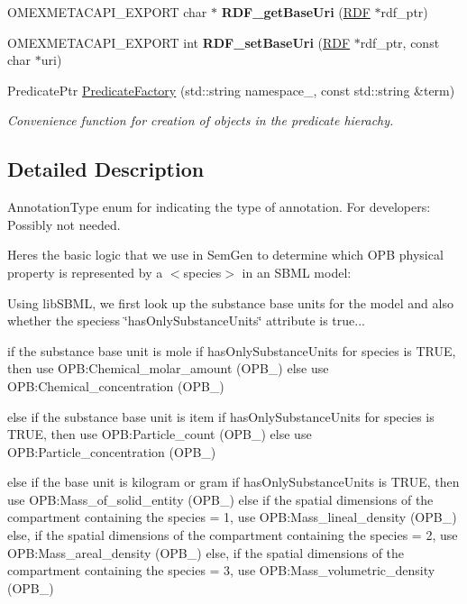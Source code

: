 \begin{DoxyCompactItemize}
O\+M\+E\+X\+M\+E\+T\+A\+C\+A\+P\+I\+\_\+\+E\+X\+P\+O\+RT char $\ast$ {\bfseries R\+D\+F\+\_\+get\+Base\+Uri} (\hyperlink{classomexmeta_1_1RDF}{R\+DF} $\ast$rdf\+\_\+ptr)
\item 
\mbox{\label{namespaceomexmeta_a64ae848c4570f1efb4d47e795b76adcd}} 
O\+M\+E\+X\+M\+E\+T\+A\+C\+A\+P\+I\+\_\+\+E\+X\+P\+O\+RT int {\bfseries R\+D\+F\+\_\+set\+Base\+Uri} (\hyperlink{classomexmeta_1_1RDF}{R\+DF} $\ast$rdf\+\_\+ptr, const char $\ast$uri)
\item 
Predicate\+Ptr \hyperlink{namespaceomexmeta_a0a8d50daa10e421d0722520cdef0ab9a}{Predicate\+Factory} (std\+::string namespace\+\_\+, const std\+::string \&term)
\begin{DoxyCompactList}\small\item\em Convenience function for creation of objects in the predicate hierachy. \end{DoxyCompactList}\end{DoxyCompactItemize}


\subsection{Detailed Description}
Annotation\+Type enum for indicating the type of annotation. For developers\+: Possibly not needed.

Here\textquotesingle{}s the basic logic that we use in Sem\+Gen to determine which O\+PB physical property is represented by a $<$species$>$ in an S\+B\+ML model\+:

Using lib\+S\+B\+ML, we first look up the substance base units for the model and also whether the species\textquotesingle{}s \char`\"{}has\+Only\+Substance\+Units\char`\"{} attribute is true...

if the substance base unit is mole if has\+Only\+Substance\+Units for species is T\+R\+UE, then use O\+PB\+:Chemical\+\_\+molar\+\_\+amount (O\+P\+B\+\_) else use O\+PB\+:Chemical\+\_\+concentration (O\+P\+B\+\_)

else if the substance base unit is item if has\+Only\+Substance\+Units for species is T\+R\+UE, then use O\+PB\+:Particle\+\_\+count (O\+P\+B\+\_) else use O\+PB\+:Particle\+\_\+concentration (O\+P\+B\+\_)

else if the base unit is kilogram or gram if has\+Only\+Substance\+Units is T\+R\+UE, then use O\+PB\+:Mass\+\_\+of\+\_\+solid\+\_\+entity (O\+P\+B\+\_) else if the spatial dimensions of the compartment containing the species = 1, use O\+PB\+:Mass\+\_\+lineal\+\_\+density (O\+P\+B\+\_) else, if the spatial dimensions of the compartment containing the species = 2, use O\+PB\+:Mass\+\_\+areal\+\_\+density (O\+P\+B\+\_) else, if the spatial dimensions of the compartment containing the species = 3, use O\+PB\+:Mass\+\_\+volumetric\+\_\+density (O\+P\+B\+\_)

